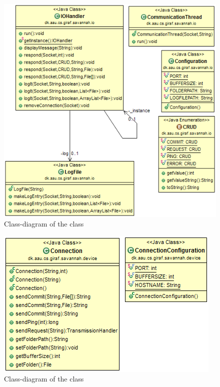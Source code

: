 
\begin{figure}[H]
	\centering
		\includegraphics[scale=0.70]{images/IOHandler.PNG}
	\caption{Class-diagram of the  class}
	\label{fig:app:IOHandler}
\end{figure}

\begin{figure}[H]
	\centering
		\includegraphics[scale=0.70]{images/Connection.PNG}
	\caption{Class-diagram of the  class}
	\label{fig:app:Connection}
\end{figure}

